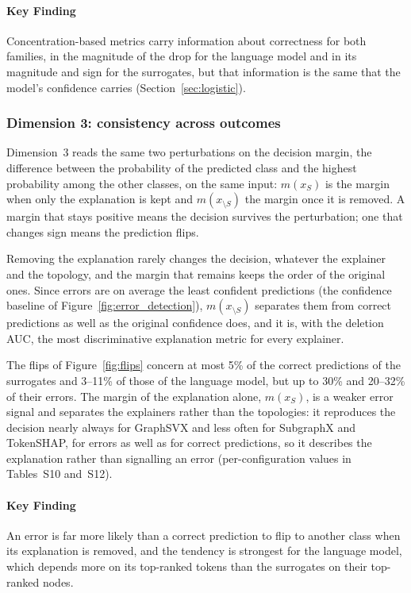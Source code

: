 \paragraph{\textbf{Key Finding}}
Concentration-based metrics carry information about correctness for both families, in the magnitude of the drop for the language model and in its magnitude and sign for the surrogates, but that information is the same that the model's confidence carries (Section~\ref{sec:logistic}).

\subsubsection{Dimension 3: consistency across outcomes}

Dimension~3 reads the same two perturbations on the decision margin, the difference between the probability of the predicted class and the highest probability among the other classes, on the same input: \(m(x_S)\) is the margin when only the explanation is kept and \(m(x_{\setminus S})\) the margin once it is removed. A margin that stays positive means the decision survives the perturbation; one that changes sign means the prediction flips.

Removing the explanation rarely changes the decision, whatever the explainer and the topology, and the margin that remains keeps the order of the original ones. Since errors are on average the least confident predictions (the confidence baseline of Figure~\ref{fig:error_detection}), \(m(x_{\setminus S})\) separates them from correct predictions as well as the original confidence does, and it is, with the deletion AUC, the most discriminative explanation metric for every explainer.

The flips of Figure~\ref{fig:flips} concern at most 5\% of the correct predictions of the surrogates and 3--11\% of those of the language model, but up to 30\% and 20--32\% of their errors. The margin of the explanation alone, \(m(x_S)\), is a weaker error signal and separates the explainers rather than the topologies: it reproduces the decision nearly always for GraphSVX and less often for SubgraphX and TokenSHAP, for errors as well as for correct predictions, so it describes the explanation rather than signalling an error (per-configuration values in Tables~S10 and~S12).

\paragraph{\textbf{Key Finding}}
An error is far more likely than a correct prediction to flip to another class when its explanation is removed, and the tendency is strongest for the language model, which depends more on its top-ranked tokens than the surrogates on their top-ranked nodes.


